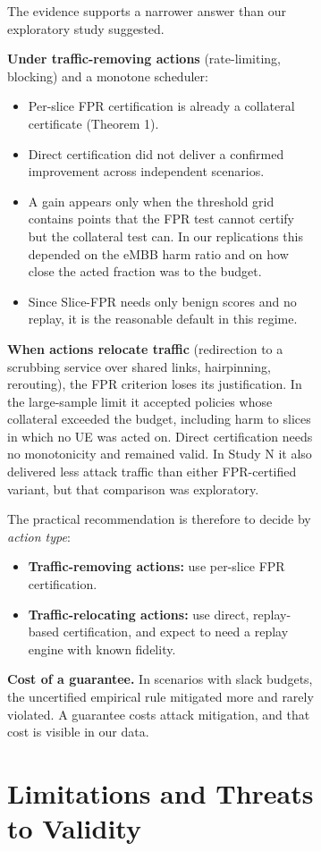 \begin{figure}[!t]
{\begin{figure}[!t]
{The evidence supports a narrower answer than our exploratory study
suggested.

\textbf{Under traffic-removing actions} (rate-limiting, blocking) and a
monotone scheduler:

\begin{itemize}
\tightlist
\item
  Per-slice FPR certification is already a collateral certificate
  (Theorem 1).
\item
  Direct certification did not deliver a confirmed improvement across
  independent scenarios.
\item
  A gain appears only when the threshold grid contains points that the
  FPR test cannot certify but the collateral test can. In our
  replications this depended on the eMBB harm ratio and on how close the
  acted fraction was to the budget.
\item
  Since Slice-FPR needs only benign scores and no replay, it is the
  reasonable default in this regime.
\end{itemize}

\textbf{When actions relocate traffic} (redirection to a scrubbing
service over shared links, hairpinning, rerouting), the FPR criterion
loses its justification. In the large-sample limit it accepted policies
whose collateral exceeded the budget, including harm to slices in which
no UE was acted on. Direct certification needs no monotonicity and
remained valid. In Study N it also delivered less attack traffic than
either FPR-certified variant, but that comparison was exploratory.

The practical recommendation is therefore to decide by \emph{action
type}:

\begin{itemize}
\tightlist
\item
  \textbf{Traffic-removing actions:} use per-slice FPR certification.
\item
  \textbf{Traffic-relocating actions:} use direct, replay-based
  certification, and expect to need a replay engine with known fidelity.
\end{itemize}

\textbf{Cost of a guarantee.} In scenarios with slack budgets, the
uncertified empirical rule mitigated more and rarely violated. A
guarantee costs attack mitigation, and that cost is visible in our data.

\hypertarget{sec:limits}{%
\section{Limitations and Threats to Validity}\label{sec:limits}}

}
\end{figure}}
\end{figure}
